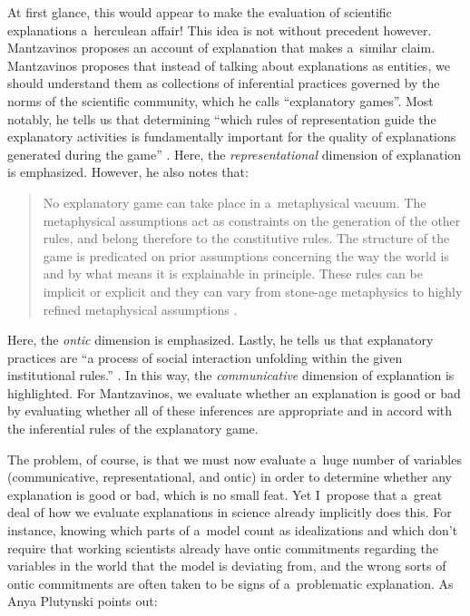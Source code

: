At first glance, this would appear to make the evaluation of scientific explanations a~herculean affair! This idea is not without precedent however. Mantzavinos
\parencite*[][]{mantzavinos_explanatory_2016} %
 proposes an account of explanation that makes a~similar claim. Mantzavinos proposes that instead of talking about explanations as entities, we should understand them as collections of inferential practices governed by the norms of the scientific community, which he calls ``explanatory games''. Most notably, he tells us that determining ``which rules of representation guide the explanatory activities is fundamentally important for the quality of explanations generated during the game'' 
\parencite[][p.42]{mantzavinos_explanatory_2016}. %
 Here, the \textit{representational} dimension of explanation is emphasized. However, he also notes that:

\begin{quotation}
No explanatory game can take place in a~metaphysical vacuum. The metaphysical assumptions act as constraints on the generation of the other rules, and belong therefore to the constitutive rules. The structure of the game is predicated on prior assumptions concerning the way the world is and by what means it is explainable in principle. These rules can be implicit or explicit and they can vary from stone-age metaphysics to highly refined metaphysical assumptions
\parencite*[][p.41]{mantzavinos_explanatory_2016}.%


\end{quotation}
Here, the \textit{ontic} dimension is emphasized. Lastly, he tells us that explanatory practices are ``a process of social interaction unfolding within the given institutional rules.''
\parencite[][p.68]{mantzavinos_explanatory_2016}. %
 In this way, the \textit{communicative} dimension of explanation is highlighted. For Mantzavinos, we evaluate whether an explanation is good or bad by evaluating whether all of these inferences are appropriate and in accord with the inferential rules of the explanatory game.

The problem, of course, is that we must now evaluate a~huge number of variables (communicative, representational, and ontic) in order to determine whether any explanation is good or bad, which is no small feat. Yet I~propose that a~great deal of how we evaluate explanations in science already implicitly does this. For instance, knowing which parts of a~model count as idealizations and which don't require that working scientists already have ontic commitments regarding the variables in the world that the model is deviating from, and the wrong sorts of ontic commitments are often taken to be signs of a~problematic explanation. As Anya Plutynski
\parencite*[][p.472]{plutynski_cancer_2013} %
 points out:

